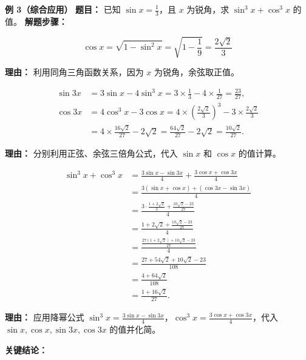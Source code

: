 \begin{examplebox}
	\medskip
	\textbf{\textcolor{CExample}{例 3（综合应用）}}
	\textbf{\textcolor{CExample}{题目：}}
	已知 $\sin x = \frac{1}{3}$，且 $x$ 为锐角，求 $\sin^3 x + \cos^3 x$ 的值。
	\textbf{\textcolor{CExample}{解题步骤：}}
	\begin{description}[style=nextline, leftmargin=2.8em, labelsep=0.5em, itemsep=0.45em]
		\item[\textbf{第一步（同角求余弦）：}]
			\[
				\cos x = \sqrt{1-\sin^2 x} = \sqrt{1-\frac{1}{9}} = \frac{2\sqrt{2}}{3}
			\]
			\par\textbf{理由：} 利用同角三角函数关系，因为 $x$ 为锐角，余弦取正值。
		\item[\textbf{第二步（三倍角求值）：}]
			\[
				\begin{aligned}
					\sin 3x &= 3\sin x - 4\sin^3 x = 3\times\frac{1}{3} - 4\times\frac{1}{27} = \frac{23}{27}, \\ \cos 3x &= 4\cos^3 x - 3\cos x = 4\times\left(\frac{2\sqrt{2}}{3}\right)^3 - 3\times\frac{2\sqrt{2}}{3} \\ &= 4\times\frac{16\sqrt{2}}{27} - 2\sqrt{2} = \frac{64\sqrt{2}}{27} - 2\sqrt{2} = \frac{10\sqrt{2}}{27}.
			\end{aligned}
			\]
			\par\textbf{理由：} 分别利用正弦、余弦三倍角公式，代入 $\sin x$ 和 $\cos x$ 的值计算。
		\item[\textbf{第三步（降幂求和）：}]
			\[
				\begin{aligned}
					\sin^3 x + \cos^3 x
					&= \frac{3\sin x - \sin 3x}{4} + \frac{3\cos x + \cos 3x}{4}\\
					&= \frac{3(\sin x+\cos x) + (\cos 3x - \sin 3x)}{4}\\
					&= \frac{3\cdot\frac{1+2\sqrt{2}}{3} + \frac{10\sqrt{2}-23}{27}}{4}\\
					&= \frac{1+2\sqrt{2} + \frac{10\sqrt{2}-23}{27}}{4}\\
					&= \frac{\frac{27(1+2\sqrt{2})+10\sqrt{2}-23}{27}}{4}\\
					&= \frac{27+54\sqrt{2}+10\sqrt{2}-23}{108}\\
					&= \frac{4+64\sqrt{2}}{108}\\
					&= \frac{1+16\sqrt{2}}{27}.
			\end{aligned}
			\]
			\par\textbf{理由：} 应用降幂公式 $\sin^3 x = \frac{3\sin x - \sin 3x}{4}$，$\cos^3 x = \frac{3\cos x + \cos 3x}{4}$，代入 $\sin x,\cos x,\sin 3x,\cos 3x$ 的值并化简。
	\end{description}
	\textbf{\textcolor{CExample}{关键结论：}}
\end{examplebox}

